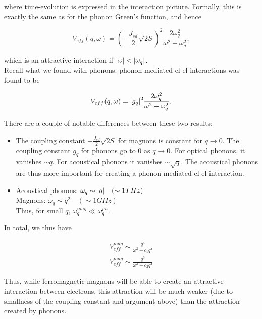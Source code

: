  where time-evolution is expressed in the interaction picture. Formally, this is exactly the same as for the phonon Green's function, and hence 
 
 \begin{equation}
 V_{eff}(q,\omega) = \left(-\frac{J_{sd}}{2}\sqrt{2S}\right)^2 \frac{2\omega_q ^2 }{\omega^2 - \omega_q ^2},
 \end{equation}
 
 which is an attractive interaction if $\abs{\omega} < \abs{\omega_q}$. \\
 
 Recall what we found with phonons: phonon-mediated el-el interactions was found to be 
 
 \begin{equation}
 V_{eff}(q,\omega) = \abs{g_q}^2 \frac{2\omega_q ^2 }{\omega^2 - \omega_q ^2}.
 \end{equation}
 
 There are a couple of notable differences between these two results: 
 
 \begin{itemize}
 	\item The coupling constant $-\frac{J_{sd}}{2}\sqrt{2S}$ for magnons is constant for $q \to 0$. The coupling constant $g_q$ for phonons go to 0 as $q \to 0$. For optical phonons, it vanishes $\sim q$. For acoustical phonons it vanishes $\sim \sqrt{q}$. The acoustical phonons are thus more important for creating a phonon mediated el-el interaction. 
 	\item Acoustical phonons: $\omega_q \sim \abs{q} \quad (\sim 1 THz)$ \\ Magnons: $\omega_q \sim q^2 \quad (\sim 1GHz)$ \\ Thus, for small $q$, $\omega_q ^{mag} \ll \omega_q ^{ph}$. 
 	
 \end{itemize}
 
 In total, we thus have 
 
 \begin{align*}
 V_{eff}^{mag} \sim \frac{q^4}{\omega^2 - c_1 q^4} \\ 
 V_{eff}^{mag} \sim \frac{q^3}{\omega^2 - c_2 q^4}
 \end{align*}
 
 Thus,  while ferromagnetic magnons will be able to create an attractive interaction between electrons, this attraction will be much weaker (due to smallness of the coupling constant and argument above) than the attraction created by phonons. \\
 
